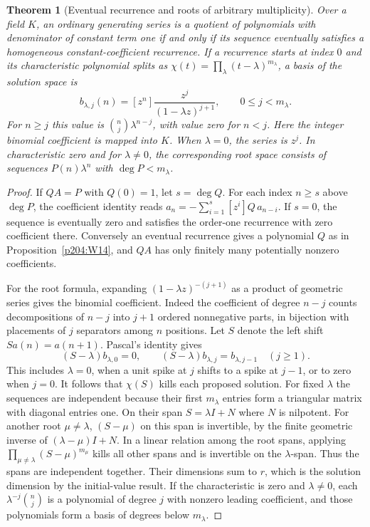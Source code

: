 \documentclass[11pt,oneside,openany]{book}
\theoremstyle{plain}
\newtheorem{theorem}{Theorem}[chapter]
\theoremstyle{definition}
\theoremstyle{remark}
\begin{document}
\begin{theorem}[Eventual recurrence and roots of arbitrary multiplicity]
\label{p204:W16}
Over a field \(K\), an ordinary generating series is a quotient
of polynomials with denominator of constant term one if and
only if its sequence eventually satisfies a homogeneous
constant-coefficient recurrence. If a recurrence starts at
index \(0\) and its characteristic polynomial splits as
\(\chi(t)=\prod_\lambda (t-\lambda)^{m_\lambda}\), a basis of
the solution space is
\[
 b_{\lambda,j}(n)=[z^n]\frac{z^j}{(1-\lambda z)^{j+1}},
 \qquad 0\le j<m_\lambda .
\]
For \(n\ge j\) this value is \(\binom nj\lambda^{n-j}\), with
value zero for \(n<j\). Here the integer binomial coefficient
is mapped into \(K\). When \(\lambda=0\), the series is \(z^j\).
In characteristic zero and for \(\lambda\ne0\), the corresponding
root space consists of sequences \(P(n)\lambda^n\) with
\(\deg P<m_\lambda\).
\end{theorem}
\begin{proof}
If \(QA=P\) with \(Q(0)=1\), let \(s=\deg Q\).
For each index \(n\ge s\) above \(\deg P\), the coefficient
identity reads \(a_n=-\sum_{i=1}^s [z^i]Q\,a_{n-i}\).
If \(s=0\), the sequence is eventually zero and satisfies
the order-one recurrence with zero coefficient there.
Conversely an eventual recurrence gives a polynomial \(Q\)
as in Proposition~\ref{p204:W14}, and \(QA\) has only finitely
many potentially nonzero coefficients.

For the root formula, expanding \((1-\lambda z)^{-(j+1)}\)
as a product of geometric series gives the binomial coefficient.
Indeed the coefficient of degree \(n-j\) counts decompositions
of \(n-j\) into \(j+1\) ordered nonnegative parts, in bijection
with placements of \(j\) separators among \(n\) positions.
Let \(S\) denote the left shift \(Sa(n)=a(n+1)\).
Pascal's identity gives
\[
 (S-\lambda)b_{\lambda,0}=0,\qquad
 (S-\lambda)b_{\lambda,j}=b_{\lambda,j-1}\quad(j\ge1).
\]
This includes \(\lambda=0\), when a unit spike at \(j\) shifts
to a spike at \(j-1\), or to zero when \(j=0\).
It follows that \(\chi(S)\) kills each proposed solution.
For fixed \(\lambda\) the sequences are independent because
their first \(m_\lambda\) entries form a triangular matrix
with diagonal entries one. On their span \(S=\lambda I+N\)
where \(N\) is nilpotent. For another root \(\mu\ne\lambda\),
\((S-\mu)\) on this span is invertible, by the finite geometric
inverse of \((\lambda-\mu)I+N\).
In a linear relation among the root spans, applying
\(\prod_{\mu\ne\lambda}(S-\mu)^{m_\mu}\) kills all other
spans and is invertible on the \(\lambda\)-span. Thus the spans
are independent together. Their dimensions sum to \(r\),
which is the solution dimension by the initial-value result.
If the characteristic is zero and \(\lambda\ne0\), each
\(\lambda^{-j}\binom nj\) is a polynomial of degree \(j\) with
nonzero leading coefficient, and those polynomials form a
basis of degrees below \(m_\lambda\).
\end{proof}
\end{document}
